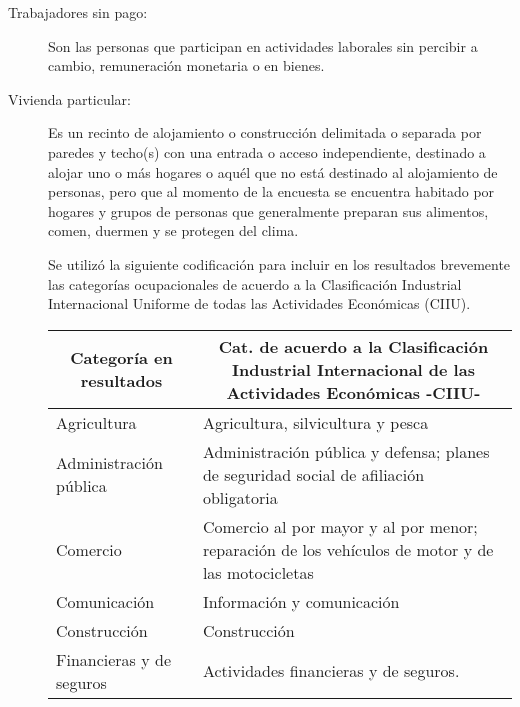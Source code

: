 \begin{description}
	\item[Trabajadores sin pago:] Son las personas que participan en actividades laborales sin percibir a cambio, remuneración monetaria o en bienes.
	\item[Vivienda particular:] Es un recinto de alojamiento o construcción delimitada o separada por paredes y techo(s) con una entrada o acceso independiente, destinado a alojar uno o más hogares o aquél que no está destinado al alojamiento de personas, pero que al momento de la encuesta se encuentra habitado por hogares y grupos de personas que generalmente preparan sus alimentos, comen, duermen y se protegen del clima.
	
	\newpage
	Se utilizó la siguiente codificación para incluir en los resultados brevemente las categorías ocupacionales de acuerdo a la Clasificación Industrial Internacional Uniforme de todas las Actividades Económicas (CIIU).
	\begin{table}[ht]
		\begin{tabular}{|l|l|}
			\hline
			\multicolumn{1}{|c|}{\textbf{Categoría en resultados}} & \multicolumn{1}{c|}{\textbf{ Cat. de acuerdo a la Clasificación Industrial Internacional de las Actividades Económicas -CIIU-}}                                        \\ \hline
			Agricultura                                            & Agricultura, silvicultura y pesca                                                                \\ \hline
			Administración pública                                 & Administración pública y defensa; planes de seguridad social de afiliación obligatoria           \\ \hline
			Comercio                                               & Comercio al por mayor y al por menor; reparación de los vehículos de motor y de las motocicletas \\ \hline
			Comunicación                                           & Información y comunicación                                                                       \\ \hline
			Construcción                                           & Construcción                                                                                     \\ \hline
			Financieras y de seguros                               & Actividades financieras y de seguros.                                                            \\ \hline

\end{tabular}
\end{table}
\end{description}
